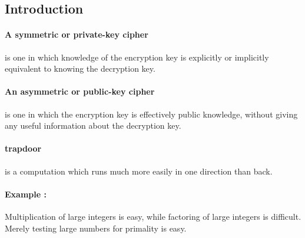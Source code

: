 \documentclass[12pt]{article}
\begin{document}
\subsection{Introduction}
\paragraph{A symmetric or private-key cipher} is one in which knowledge of the encryption key is explicitly or implicitly equivalent to knowing the decryption key.
\paragraph{An asymmetric or public-key cipher} is one in which the encryption key is effectively public knowledge, without giving any useful information about the decryption key.

\paragraph{trapdoor } is a computation which runs much more easily in one direction than back.

\paragraph{Example : }Multiplication of large integers is easy, while factoring of large integers is difficult.\\
Merely testing large numbers for primality is easy.
\end{document}
